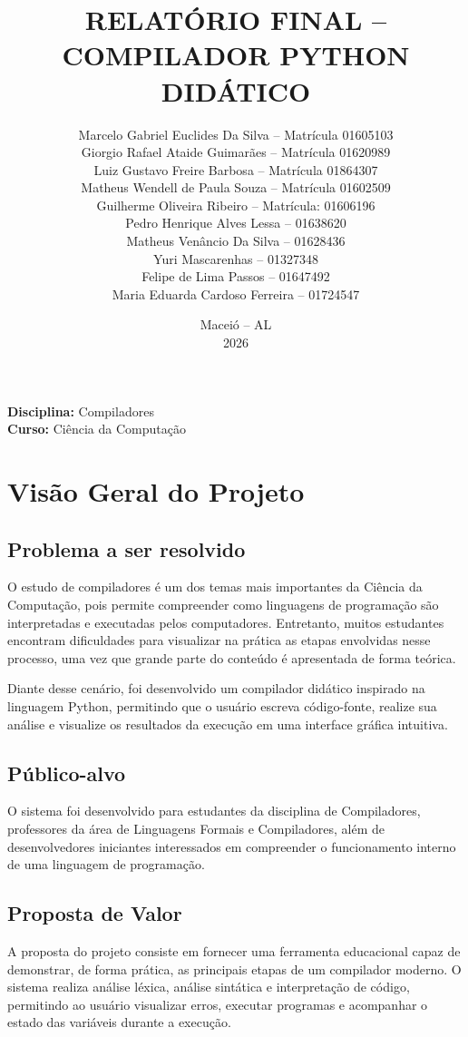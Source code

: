 \documentclass[a4paper,12pt]{article}
\title{\textbf{RELATÓRIO FINAL -- COMPILADOR PYTHON DIDÁTICO}}
\author{
Marcelo Gabriel Euclides Da Silva -- Matrícula 01605103 \\
Giorgio Rafael Ataide Guimarães -- Matrícula 01620989 \\
Luiz Gustavo Freire Barbosa -- Matrícula 01864307 \\
Matheus Wendell de Paula Souza -- Matrícula 01602509 \\
Guilherme Oliveira Ribeiro -- Matrícula: 01606196 \\
Pedro Henrique Alves Lessa -- 01638620 \\
Matheus Venâncio Da Silva -- 01628436 \\
Yuri Mascarenhas -- 01327348 \\
Felipe de Lima Passos -- 01647492 \\
Maria Eduarda Cardoso Ferreira -- 01724547
}
\date{Maceió -- AL \\ 2026}
\begin{document}
\maketitle

\begin{center}
\textbf{Disciplina:} Compiladores \\[0.2cm]
\textbf{Curso:} Ciência da Computação
\end{center}

\newpage

\section{Visão Geral do Projeto}

\subsection{Problema a ser resolvido}

O estudo de compiladores é um dos temas mais importantes da Ciência da Computação, pois permite compreender como linguagens de programação são interpretadas e executadas pelos computadores. Entretanto, muitos estudantes encontram dificuldades para visualizar na prática as etapas envolvidas nesse processo, uma vez que grande parte do conteúdo é apresentada de forma teórica.

Diante desse cenário, foi desenvolvido um compilador didático inspirado na linguagem Python, permitindo que o usuário escreva código-fonte, realize sua análise e visualize os resultados da execução em uma interface gráfica intuitiva.

\subsection{Público-alvo}

O sistema foi desenvolvido para estudantes da disciplina de Compiladores, professores da área de Linguagens Formais e Compiladores, além de desenvolvedores iniciantes interessados em compreender o funcionamento interno de uma linguagem de programação.

\subsection{Proposta de Valor}

A proposta do projeto consiste em fornecer uma ferramenta educacional capaz de demonstrar, de forma prática, as principais etapas de um compilador moderno. O sistema realiza análise léxica, análise sintática e interpretação de código, permitindo ao usuário visualizar erros, executar programas e acompanhar o estado das variáveis durante a execução.
\end{document}
